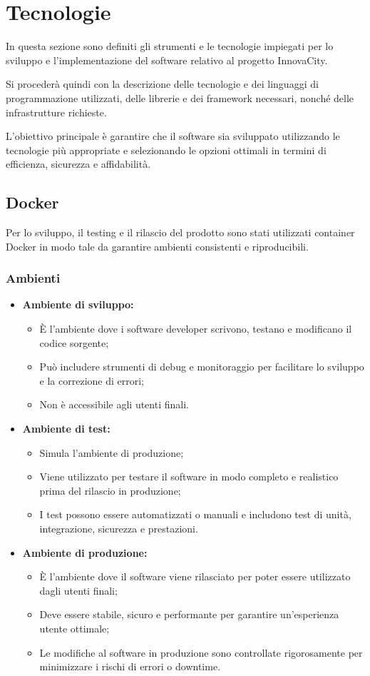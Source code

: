 \section{Tecnologie}
In questa sezione sono definiti gli strumenti e le tecnologie impiegati per lo sviluppo e l'implementazione del software relativo al progetto InnovaCity.

Si procederà quindi con la descrizione delle tecnologie e dei linguaggi di programmazione utilizzati, delle librerie e dei framework necessari, nonché delle infrastrutture richieste.

L'obiettivo principale è garantire che il software sia sviluppato utilizzando le tecnologie più appropriate e selezionando le opzioni ottimali in termini di efficienza, sicurezza e affidabilità.

\subsection{Docker}
Per lo sviluppo, il testing e il rilascio del prodotto sono stati utilizzati container Docker in modo tale da garantire ambienti consistenti e riproducibili.

\subsubsection{Ambienti}
\begin{itemize}
  \item \textbf{Ambiente di sviluppo:}
    \begin{itemize}
      \item È l'ambiente dove i software developer scrivono, testano e modificano il codice sorgente;
      \item Può includere strumenti di debug e monitoraggio per facilitare lo sviluppo e la correzione di errori;
      \item Non è accessibile agli utenti finali.
    \end{itemize}
    \item \textbf{Ambiente di test:}
    \begin{itemize}
      \item Simula l'ambiente di produzione;
      \item Viene utilizzato per testare il software in modo completo e realistico prima del rilascio in produzione;
      \item I test possono essere automatizzati o manuali e includono test di unità, integrazione, sicurezza e prestazioni.
    \end{itemize}
    \item \textbf{Ambiente di produzione:}
    \begin{itemize}
      \item È l'ambiente dove il software viene rilasciato per poter essere utilizzato dagli utenti finali;
      \item Deve essere stabile, sicuro e performante per garantire un'esperienza utente ottimale;
      \item Le modifiche al software in produzione sono controllate rigorosamente per minimizzare i rischi di errori o downtime.
    \end{itemize}
\end{itemize}

